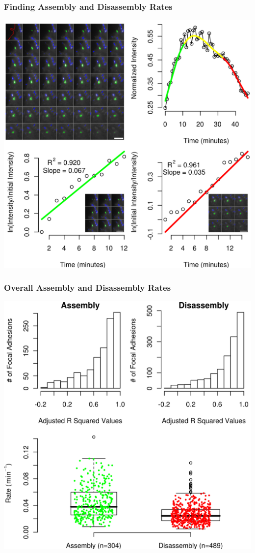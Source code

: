 \documentclass{beamer}
\begin{document}
\begin{frame}
	\frametitle{Finding Assembly and Disassembly Rates}
	\begin{center}
	\includegraphics[height=0.85\textheight]{figures/analysis/kinetics_example.png}
	\end{center}
\end{frame}

\begin{frame}
	\frametitle{Overall Assembly and Disassembly Rates}
	\begin{center}
	\includegraphics[height=0.85\textheight]{figures/analysis/overall_kinetics.png}
	\end{center}
\end{frame}
\end{document}
